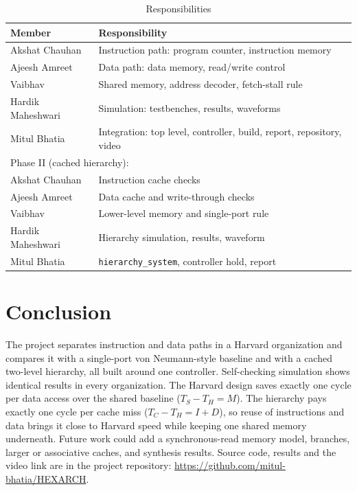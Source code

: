 \documentclass[conference,a4paper]{IEEEtran}
\begin{document}
\begin{table}[t]
\caption{Responsibilities}
\label{tab:contrib}
\centering
\begin{tabular}{p{}p{}}
\hline
Member & Responsibility \\ \hline
Akshat Chauhan & Instruction path: program counter, instruction memory \\
Ajeesh Amreet & Data path: data memory, read/write control \\
Vaibhav & Shared memory, address decoder, fetch-stall rule \\
Hardik Maheshwari & Simulation: testbenches, results, waveforms \\
Mitul Bhatia & Integration: top level, controller, build, report, repository, video \\ \hline
\multicolumn{2}{l}{Phase II (cached hierarchy):} \\
Akshat Chauhan & Instruction cache checks \\
Ajeesh Amreet & Data cache and write-through checks \\
Vaibhav & Lower-level memory and single-port rule \\
Hardik Maheshwari & Hierarchy simulation, results, waveform \\
Mitul Bhatia & \texttt{hierarchy\_system}, controller hold, report \\ \hline
\end{tabular}
\end{table}

\section{Conclusion}
The project separates instruction and data paths in a Harvard organization
and compares it with a single-port von Neumann-style baseline and with a
cached two-level hierarchy, all built around one controller. Self-checking
simulation shows identical results in every organization. The Harvard
design saves exactly one cycle per data access over the shared baseline
($T_S-T_H=M$). The hierarchy pays exactly one cycle per cache miss
($T_C-T_H=I+D$), so reuse of instructions and data brings it close to Harvard
speed while keeping one shared memory underneath. Future work could add a
synchronous-read memory model, branches, larger or associative caches, and
synthesis results. Source code, results and the video link are in the project
repository: \url{https://github.com/mitul-bhatia/HEXARCH}.
\end{document}
